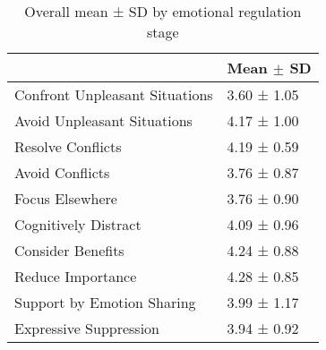 \documentclass{article}
\begin{document}
    


\begin{table}
\caption{Overall mean ± SD by emotional regulation stage}
\centering
\begin{tabular}{ll}
\toprule
    & Mean $\pm$ SD \\
\midrule
Confront Unpleasant Situations & 3.60 ± 1.05 \\
Avoid Unpleasant Situations & 4.17 ± 1.00 \\
Resolve Conflicts & 4.19 ± 0.59 \\
Avoid Conflicts & 3.76 ± 0.87 \\
Focus Elsewhere & 3.76 ± 0.90 \\
Cognitively Distract & 4.09 ± 0.96 \\
Consider Benefits & 4.24 ± 0.88 \\
Reduce Importance & 4.28 ± 0.85 \\
Support by Emotion Sharing & 3.99 ± 1.17 \\
Expressive Suppression & 3.94 ± 0.92 \\
\bottomrule
\end{tabular}
\end{table}
\end{document}
